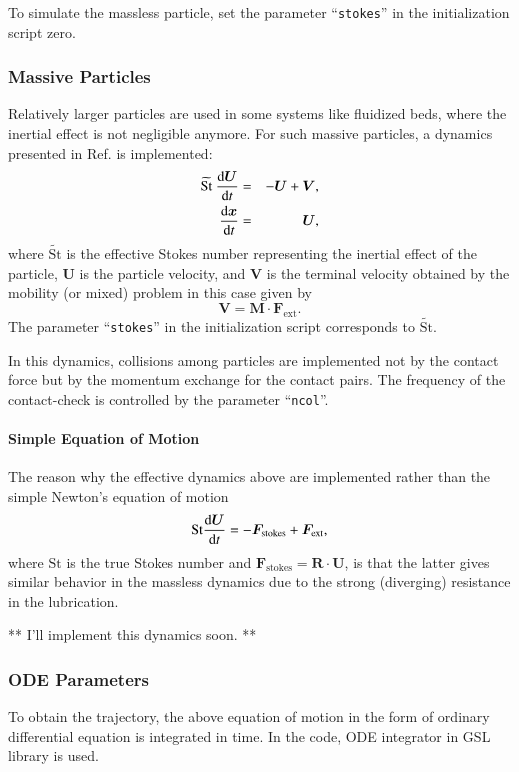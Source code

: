 \documentclass{book}
\begin{document}
To simulate the massless particle, set the parameter ``{\tt stokes}'' 
in the initialization script zero.


\subsubsection{Massive Particles}
Relatively larger particles are used in some systems like fluidized beds,
where the inertial effect is not negligible anymore.
For such massive particles,
a dynamics presented in Ref. \cite{IchikiHayakawa1995,IchikiHayakawa1998}
is implemented:
\begin{eqnarray}
  \widetilde{\text{St}}\ 
  \frac{{\rm d}\bm{U}}{{\rm d}t}
  &=&
  -\bm{U}+\bm{V}
  ,
  \\
  \frac{{\rm d}\bm{x}}{{\rm d}t}
  &=&
  \bm{U}
  ,
\end{eqnarray}
where $\widetilde{\text{St}}$ is the effective Stokes number
representing the inertial effect of the particle,
$\bm{U}$ is the particle velocity, and
$\bm{V}$ is the terminal velocity obtained
by the mobility (or mixed) problem in this case given by
\begin{equation}
  \bm{V}
  =
  \bm{M}\cdot\bm{F}_{\text{ext}}
  .
\end{equation}
The parameter ``{\tt stokes}'' in the initialization script 
corresponds to $\widetilde{\text{St}}$.


In this dynamics, collisions among particles are implemented 
not by the contact force but by the momentum exchange
for the contact pairs. The frequency of the contact-check 
is controlled by the parameter ``{\tt ncol}''.


\paragraph{Simple Equation of Motion}
The reason why the effective dynamics above are implemented
rather than the simple Newton's equation of motion
\begin{equation}
  \text{St}
  \frac{{\rm d}\bm{U}}{{\rm d}t}
  =
  -\bm{F}_{\text{stokes}}
  +\bm{F}_{\text{ext}}
  ,
\end{equation}
where $\text{St}$ is the true Stokes number
and $\bm{F}_{\text{stokes}} = \bm{R}\cdot\bm{U}$,
is that
the latter gives similar behavior in the massless dynamics
due to the strong (diverging) resistance in the lubrication.
\cite{IchikiHayakawa1998}

** I'll implement this dynamics soon. **

\subsubsection{ODE Parameters}
To obtain the trajectory, the above equation of motion
in the form of ordinary differential equation
is integrated in time.
In the code, ODE integrator in GSL library\cite{GSL} is used.
\end{document}
